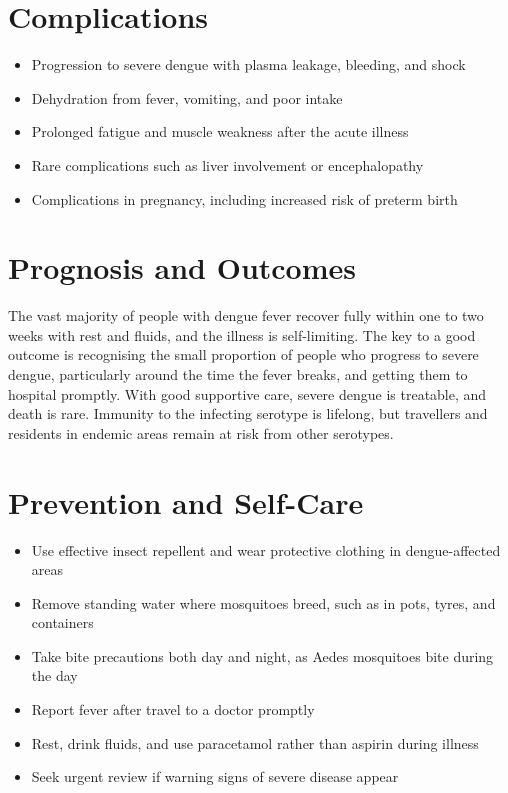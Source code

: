 \section*{Complications}
\begin{itemize}
    \item Progression to severe dengue with plasma leakage, bleeding, and shock
    \item Dehydration from fever, vomiting, and poor intake
    \item Prolonged fatigue and muscle weakness after the acute illness
    \item Rare complications such as liver involvement or encephalopathy
    \item Complications in pregnancy, including increased risk of preterm birth
\end{itemize}

\section*{Prognosis and Outcomes}
The vast majority of people with dengue fever recover fully within one to two weeks with rest and fluids, and the illness is self-limiting. The key to a good outcome is recognising the small proportion of people who progress to severe dengue, particularly around the time the fever breaks, and getting them to hospital promptly. With good supportive care, severe dengue is treatable, and death is rare. Immunity to the infecting serotype is lifelong, but travellers and residents in endemic areas remain at risk from other serotypes.

\section*{Prevention and Self-Care}
\begin{itemize}
    \item Use effective insect repellent and wear protective clothing in dengue-affected areas
    \item Remove standing water where mosquitoes breed, such as in pots, tyres, and containers
    \item Take bite precautions both day and night, as Aedes mosquitoes bite during the day
    \item Report fever after travel to a doctor promptly
    \item Rest, drink fluids, and use paracetamol rather than aspirin during illness
    \item Seek urgent review if warning signs of severe disease appear
\end{itemize}

